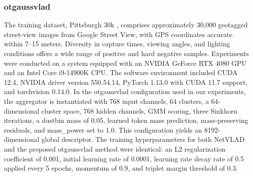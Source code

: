 \documentclass[journal]{IEEEtran}
\begin{document}
\subsubsection{otgaussvlad}
The training dataset, Pittsburgh 30k \cite{ref7}, comprises approximately 30,000 geotagged street-view images from Google Street View, with GPS coordinates accurate within 7--15 meters. Diversity in capture times, viewing angles, and lighting conditions offers a wide range of positive and hard negative samples. Experiments were conducted on a system equipped with an NVIDIA GeForce RTX 4080 GPU and an Intel Core i9-14900K CPU. The software environment included CUDA 12.4, NVIDIA driver version 550.54.14, PyTorch 1.13.0 with CUDA 11.7 support, and torchvision 0.14.0. In the otgaussvlad configuration used in our experiments, the aggregator is instantiated with 768 input channels, 64 clusters, a 64-dimensional cluster space, 768 hidden channels, GMM scoring, three Sinkhorn iterations, a dustbin mass of 0.05, learned token mass prediction, mass-preserving residuals, and mass\_power set to 1.0. This configuration yields an 8192-dimensional global descriptor. The training hyperparameters for both NetVLAD and the proposed otgaussvlad method were identical: an L2 regularization coefficient of 0.001, initial learning rate of 0.0001, learning rate decay rate of 0.5 applied every 5 epochs, momentum of 0.9, and triplet margin threshold of 0.3.


\end{document}

